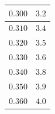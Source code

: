 \documentclass[letterpaper, 12pt]{article}
\begin{document}
\begin{longtable}{|c|c|}
    \hline
    $0.300$                                                                                                                                                                     & $3.2$                                                                                                                                                                                  \\
    \hline
    $0.310$                                                                                                                                                                     & $3.4$                                                                                                                                                                                  \\
    \hline
    $0.320$                                                                                                                                                                     & $3.5$                                                                                                                                                                                  \\
    \hline
    $0.330$                                                                                                                                                                     & $3.6$                                                                                                                                                                                  \\
    \hline
    $0.340$                                                                                                                                                                     & $3.8$                                                                                                                                                                                  \\
    \hline
    $0.350$                                                                                                                                                                     & $3.9$                                                                                                                                                                                  \\
    \hline
    $0.360$                                                                                                                                                                     & $4.0$                                                                                                                                                                                  \\

\end{longtable}
\end{document}
